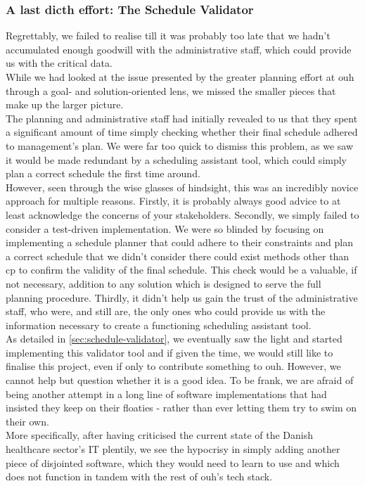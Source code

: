 \subsubsection*{A last dicth effort: The Schedule Validator}
Regrettably, we failed to realise till it was probably too late that we hadn't accumulated enough goodwill with the administrative staff, which could provide us with the critical data. 
\\
While we had looked at the issue presented by the greater planning effort at \acrshort{ouh} through a goal- and solution-oriented lens, we missed the smaller pieces that make up the larger picture.
\\
The planning and administrative staff had initially revealed to us that they spent a significant amount of time simply checking whether their final schedule adhered to management's plan. We were far too quick to dismiss this problem, as we saw it would be made redundant by a scheduling assistant tool, which could simply plan a correct schedule the first time around.
\\
However, seen through the wise glasses of hindsight, this was an incredibly novice approach for multiple reasons. Firstly, it is probably always good advice to at least acknowledge the concerns of your stakeholders. Secondly, we simply failed to consider a test-driven implementation. We were so blinded by focusing on implementing a schedule planner that could adhere to their constraints and plan a correct schedule that we didn't consider there could exist methods other than \acrshort{cp} to confirm the validity of the final schedule. This check would be a valuable, if not necessary, addition to any solution which is designed to serve the full planning procedure. Thirdly, it didn't help us gain the trust of the administrative staff, who were, and still are, the only ones who could provide us with the information necessary to create a functioning scheduling assistant tool. 
\\
As detailed in \autoref{sec:schedule-validator}, we eventually saw the light and started implementing this validator tool and if given the time, we would still like to finalise this project, even if only to contribute something to \acrshort{ouh}. However, we cannot help but question whether it is a good idea. To be frank, we are afraid of being another attempt in a long line of software implementations that had insisted they keep on their floaties - rather than ever letting them try to swim on their own.
\\
More specifically, after having criticised the current state of the Danish healthcare sector's IT plentily, we see the hypocrisy in simply adding another piece of disjointed software, which they would need to learn to use and which does not function in tandem with the rest of \acrshort{ouh}'s tech stack.

